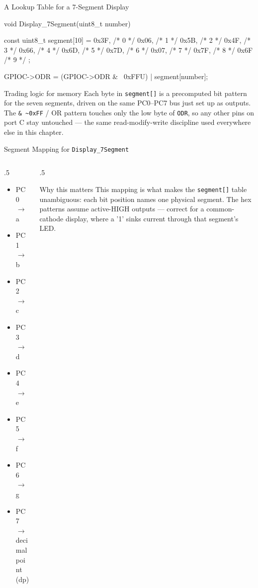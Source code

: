 \documentclass[9pt,aspectratio=169,xcolor=table]{beamer}
\begin{document}
{\beamerextras
\begin{frame}[fragile]{A Lookup Table for a 7-Segment Display}
	\begin{cc}[basicstyle=\ttfamily\scriptsize]
void Display_7Segment(uint8_t number)
{
    const uint8_t segment[10] =
    {
        0x3F,  /* 0 */
        0x06,  /* 1 */
        0x5B,  /* 2 */
        0x4F,  /* 3 */
        0x66,  /* 4 */
        0x6D,  /* 5 */
        0x7D,  /* 6 */
        0x07,  /* 7 */
        0x7F,  /* 8 */
        0x6F   /* 9 */
    };

    GPIOC->ODR = (GPIOC->ODR & ~0xFFU) | segment[number];
}
\end{cc}

	\vspace{0.5mm}
	\begin{block}{Trading logic for memory}
		Each byte in \texttt{segment[]} is a precomputed bit pattern for
		the seven segments, driven on the same PC0--PC7 bus just set up
		as outputs. The \texttt{\&\ \textasciitilde{}0xFF} / OR pattern
		touches only the low byte of \texttt{ODR}, so any other pins on
		port C stay untouched --- the same \alert{read-modify-write}
		discipline used everywhere else in this chapter.
	\end{block}
\end{frame}
}

{\beamerextras
\begin{frame}{Segment Mapping for \texttt{Display\_7Segment}}
	\begin{columns}[c]
		\begin{column}{.5\textwidth}
			\begin{itemize}
				\item PC0 $\rightarrow$ a
				\item PC1 $\rightarrow$ b
				\item PC2 $\rightarrow$ c
				\item PC3 $\rightarrow$ d
				\item PC4 $\rightarrow$ e
				\item PC5 $\rightarrow$ f
				\item PC6 $\rightarrow$ g
				\item PC7 $\rightarrow$ decimal point (dp)
			\end{itemize}
		\end{column}
		\begin{column}{.5\textwidth}
			\begin{block}{Why this matters}
				This mapping is what makes the \texttt{segment[]} table
				unambiguous: each bit position names one physical segment.
				The hex patterns assume \alert{active-HIGH} outputs ---
				correct for a \alert{common-cathode} display, where a '1'
				sinks current through that segment's LED.
			\end{block}
		\end{column}
	\end{columns}
\end{frame}
}
\end{document}
